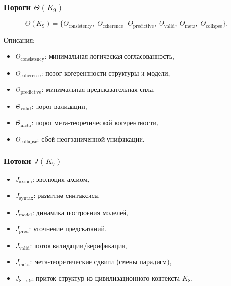 \subsubsection{Пороги \texorpdfstring{$\Theta(K_9)$}{\Theta(K_9)}}

\[
\Theta(K_9)=
\{
\Theta_{\mathrm{consistency}},\;
\Theta_{\mathrm{coherence}},\;
\Theta_{\mathrm{predictive}},\;
\Theta_{\mathrm{valid}},\;
\Theta_{\mathrm{meta}},\;
\Theta_{\mathrm{collapse}}
\}.
\]

Описания:
\begin{itemize}
    \item $\Theta_{\mathrm{consistency}}$: минимальная логическая согласованность,
    \item $\Theta_{\mathrm{coherence}}$: порог когерентности структуры и модели,
    \item $\Theta_{\mathrm{predictive}}$: минимальная предсказательная сила,
    \item $\Theta_{\mathrm{valid}}$: порог валидации,
    \item $\Theta_{\mathrm{meta}}$: порог мета-теоретической когерентности,
    \item $\Theta_{\mathrm{collapse}}$: сбой неограниченной унификации.
\end{itemize}

\subsubsection{Потоки \texorpdfstring{$J(K_9)$}{J(K_9)}}

\begin{itemize}
    \item $J_{\mathrm{axiom}}$: эволюция аксиом,
    \item $J_{\mathrm{syntax}}$: развитие синтаксиса,
    \item $J_{\mathrm{model}}$: динамика построения моделей,
    \item $J_{\mathrm{pred}}$: уточнение предсказаний,
    \item $J_{\mathrm{valid}}$: поток валидации/верификации,
    \item $J_{\mathrm{meta}}$: мета-теоретические сдвиги (смены парадигм),
    \item $J_{8\to9}$: приток структур из цивилизационного контекста $K_8$.
\end{itemize}


